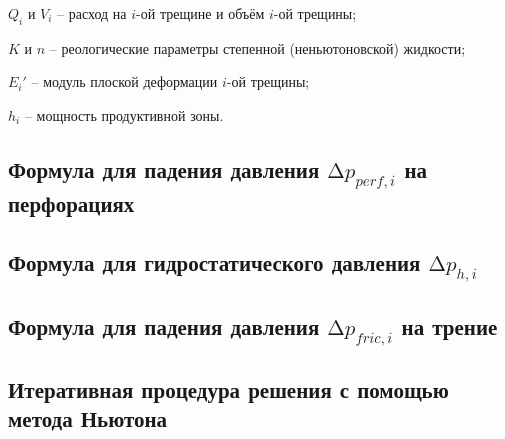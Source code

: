 \documentclass[main.tex]{subfiles}
\begin{document}
$Q_i$ и $V_i$ -- расход на $i$-ой трещине и объём $i$-ой трещины;

$K$ и $n$ -- реологические параметры степенной (неньютоновской) жидкости;

$E_i'$ -- модуль плоской деформации $i$-ой трещины;

$h_i$ -- мощность продуктивной зоны.


\subsection{Формула для падения давления $\text{Δ} p_{perf,i}$ на перфорациях}


\subsection{Формула для гидростатического давления $\text{Δ} p_{h,i}$}


\subsection{Формула для падения давления $\text{Δ} p_{fric,i}$ на трение}


\subsection{Итеративная процедура решения с помощью метода Ньютона}
\end{document}
